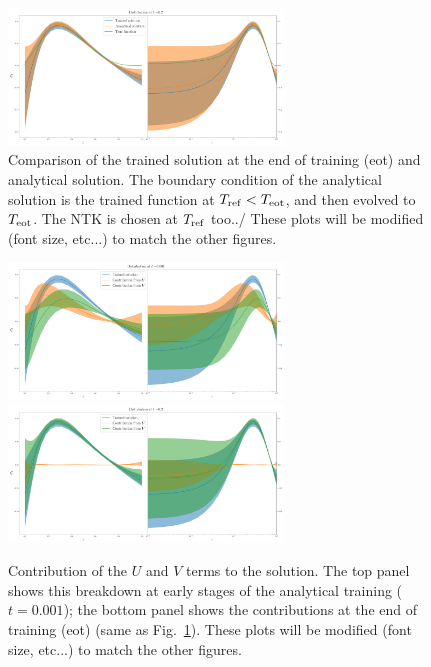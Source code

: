 \begin{figure}[t!]
  \centering
  \includegraphics[width=0.65\textwidth]{plots/xT3_2.png}
  \caption{Comparison of the trained solution at the end of training (eot) and analytical solution.
  The boundary condition of the analytical solution is the trained function at $T_{\rm ref} < T_{\rm eot}$,
  and then evolved to $T_{\rm eot}$. The NTK is chosen at $T_{\rm ref}$ too../
  \ac{These plots will be modified (font size, etc...) to match the other figures.}}
  \label{fig:xT3_analytical}
\end{figure}

\begin{figure}[t!]
  \centering
  \includegraphics[width=0.65\textwidth]{plots/xT3_u_v_contribution_small_t.pdf} \\
  \includegraphics[width=0.65\textwidth]{plots/xT3_u_v_contribution_eot.pdf}
  \caption{Contribution of the $U$ and $V$ terms to the solution. The top panel shows this breakdown
  at early stages of the analytical training ($t=0.001$); the bottom panel shows the contributions at the end
  of training (eot) (same as Fig.~\ref{fig:xT3_analytical}).
  \ac{These plots will be modified (font size, etc...) to match the other figures.}}
\end{figure}
